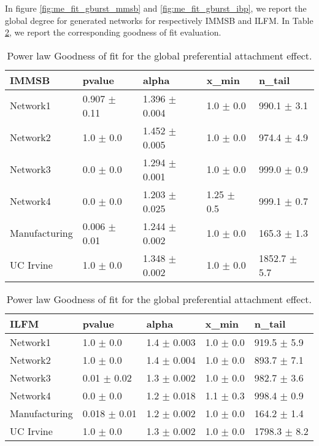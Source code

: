 \documentclass[a4paper, 12pt]{article}
\begin{document}
In figure \ref{fig:me_fit_gburst_mmsb} and \ref{fig:me_fit_gburst_ibp}, we report the global degree for generated networks for respectively IMMSB and ILFM. In Table \ref{table:global_gof}, we report the corresponding goodness of fit evaluation.





\begin{table}
    \caption{Power law Goodness of fit for the global preferential attachment effect.}
\centering
    \begin{tabular}{lllll}
    \hline
        \textbf{IMMSB} & pvalue          & alpha           & x\_min          & n\_tail           \\
    \hline
    Network1     & 0.907 $\pm$ 0.11 & 1.396 $\pm$ 0.004 & 1.0 $\pm$ 0.0    & 990.1 $\pm$ 3.1  \\
    Network2     & 1.0 $\pm$ 0.0     & 1.452 $\pm$ 0.005 & 1.0 $\pm$ 0.0    & 974.4 $\pm$ 4.9  \\
    Network3     & 0.0 $\pm$ 0.0     & 1.294 $\pm$ 0.001 & 1.0 $\pm$ 0.0    & 999.0 $\pm$ 0.9 \\
    Network4     & 0.0 $\pm$ 0.0     & 1.203 $\pm$ 0.025 & 1.25 $\pm$ 0.5 & 999.1 $\pm$ 0.7 \\
    Manufacturing & 0.006 $\pm$ 0.01 & 1.244 $\pm$ 0.002 & 1.0 $\pm$ 0.0    & 165.3 $\pm$ 1.3 \\
    UC Irvine     & 1.0 $\pm$ 0.0     & 1.348 $\pm$ 0.002 & 1.0 $\pm$ 0.0    & 1852.7 $\pm$ 5.7 \\
    \hline
    \end{tabular}

    \begin{tabular}{lllll}
    \hline
        \textbf{ILFM} & pvalue          & alpha           & x\_min       & n\_tail           \\
    \hline
    Network1     & 1.0 $\pm$ 0.0     & 1.4 $\pm$ 0.003 & 1.0 $\pm$ 0.0 & 919.5 $\pm$ 5.9 \\
    Network2     & 1.0 $\pm$ 0.0     & 1.4 $\pm$ 0.004 & 1.0 $\pm$ 0.0 & 893.7 $\pm$ 7.1  \\
    Network3     & 0.01 $\pm$ 0.02  & 1.3 $\pm$ 0.002 & 1.0 $\pm$ 0.0 & 982.7 $\pm$ 3.6 \\
    Network4     & 0.0 $\pm$ 0.0     & 1.2 $\pm$ 0.018 & 1.1 $\pm$ 0.3 & 998.4 $\pm$ 0.9 \\
    Manufacturing & 0.018 $\pm$ 0.01 & 1.2 $\pm$ 0.002 & 1.0 $\pm$ 0.0 & 164.2 $\pm$ 1.4 \\
    UC Irvine     & 1.0 $\pm$ 0.0     & 1.3 $\pm$ 0.002 & 1.0 $\pm$ 0.0 & 1798.3 $\pm$ 8.2 \\
    \hline
    \end{tabular}
    \label{table:global_gof}
\end{table}
\end{document}
